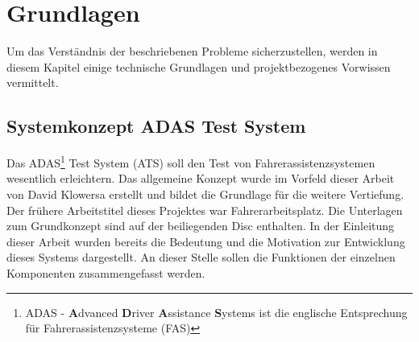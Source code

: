 \documentclass[12pt,a4paper]{report}
\begin{document}
\chapter{Grundlagen}\label{chap:Grundlagen}
Um das Verständnis der beschriebenen Probleme sicherzustellen, werden in diesem Kapitel einige technische Grundlagen und projektbezogenes Vorwissen vermittelt.
\section{Systemkonzept ADAS Test System}\label{sec:Systemkonzept ADAS Test System}
Das ADAS\footnote{ADAS - \textbf{A}dvanced \textbf{D}river \textbf{A}ssistance \textbf{S}ystems ist die englische Entsprechung für Fahrerassistenzsysteme (FAS)} Test System (ATS) soll den Test von Fahrerassistenzsystemen wesentlich erleichtern. Das allgemeine Konzept wurde im Vorfeld dieser Arbeit von David Klowersa erstellt und bildet die Grundlage für die weitere Vertiefung. Der frühere Arbeitstitel dieses Projektes war Fahrerarbeitsplatz. Die Unterlagen zum Grundkonzept sind auf der beiliegenden Disc enthalten. In der Einleitung dieser Arbeit wurden bereits die Bedeutung und die Motivation zur Entwicklung dieses Systems dargestellt. An dieser Stelle sollen die Funktionen der einzelnen Komponenten zusammengefasst werden.
\end{document}

